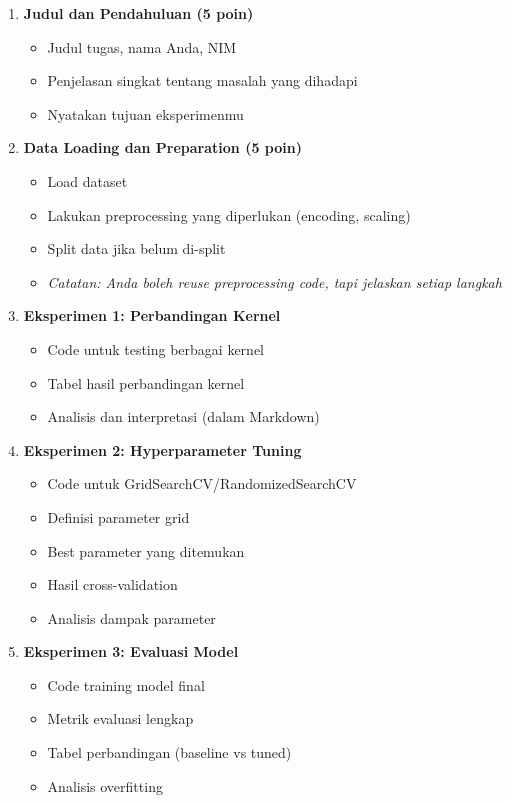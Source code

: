 \documentclass[12pt,a4paper]{article}
\begin{document}
\begin{enumerate}[label=\textbf{\arabic*.}]
    \item \textbf{Judul dan Pendahuluan (5 poin)}
    \begin{itemize}
        \item Judul tugas, nama Anda, NIM
        \item Penjelasan singkat tentang masalah yang dihadapi
        \item Nyatakan tujuan eksperimenmu
    \end{itemize}
    
    \item \textbf{Data Loading dan Preparation (5 poin)}
    \begin{itemize}
        \item Load dataset
        \item Lakukan preprocessing yang diperlukan (encoding, scaling)
        \item Split data jika belum di-split
        \item \textit{Catatan: Anda boleh reuse preprocessing code, tapi jelaskan setiap langkah}
    \end{itemize}
    
    \item \textbf{Eksperimen 1: Perbandingan Kernel}
    \begin{itemize}
        \item Code untuk testing berbagai kernel
        \item Tabel hasil perbandingan kernel
        \item Analisis dan interpretasi (dalam Markdown)
    \end{itemize}
    
    \item \textbf{Eksperimen 2: Hyperparameter Tuning}
    \begin{itemize}
        \item Code untuk GridSearchCV/RandomizedSearchCV
        \item Definisi parameter grid
        \item Best parameter yang ditemukan
        \item Hasil cross-validation
        \item Analisis dampak parameter
    \end{itemize}
    
    \item \textbf{Eksperimen 3: Evaluasi Model}
    \begin{itemize}
        \item Code training model final
        \item Metrik evaluasi lengkap
        \item Tabel perbandingan (baseline vs tuned)
        \item Analisis overfitting
    \end{itemize}
    

\end{enumerate}
\end{document}
